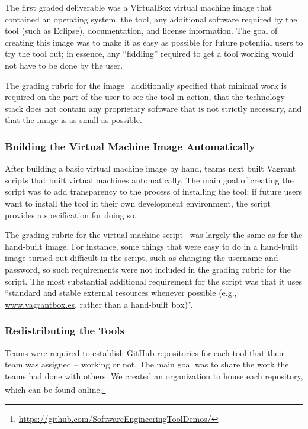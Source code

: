 \documentclass[10pt,conference]{IEEEtran}
\begin{document}
The first graded deliverable was a VirtualBox virtual machine
image that contained an operating system, the tool, any
additional software required by the tool (such as Eclipse),
documentation, and license information.
The goal of creating this image was to make it as
easy as possible for future potential users to try
the tool out; in essence, any ``fiddling'' required to get
a tool working would not have to be done by the user.

The grading rubric for the image~\cite{vm}
additionally specified that minimal work is required
on the part of the user to see the tool in action,
that the technology stack does not contain any proprietary 
software that is not strictly necessary,
and that the image is as small as possible.


\subsubsection{Building the Virtual Machine Image Automatically}

After building a basic virtual machine image by hand,
teams next built Vagrant scripts that built virtual machines
automatically.
The main goal of creating the script was to add 
transparency to the process
of installing the tool; if future users want to install the tool
in their own development environment, the script provides a
specification for doing so.

The grading rubric for the virtual machine 
script~\cite{vmscript}
was largely the same as for the hand-built image.
For instance, some things that were easy to do in a hand-built 
image turned out difficult in the script, such as changing 
the username and password, so such requirements were 
not included in the grading rubric for the script.
The most substantial additional requirement for the script
was that it uses ``standard and stable external resources 
whenever possible (e.g., \url{www.vagrantbox.es}, rather than a 
hand-built box)''.

\subsubsection{Redistributing the Tools}

Teams were required to establish GitHub repositories 
for each tool that their team was assigned -- working or not.
The main goal was to share the work the teams had 
done with others.
We created an organization to house each repository,
which can be found 
online.\footnote{\url{https://github.com/SoftwareEngineeringToolDemos/}}
\end{document}
